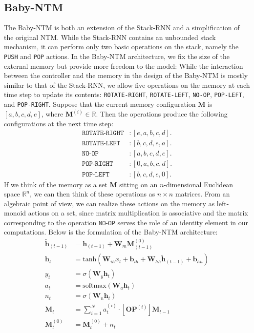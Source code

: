 \documentclass[11pt,a4paper]{article}
\theoremstyle{plain}
\newcommand{\weight}[1] {\mathbf{W}_{#1}}
\newcommand{\bias}[1] {\mathbf{b}_{#1}}
\newcommand{\hidden}[1] {\mathbf{h}_{#1}}
\newcommand{\hiddenp}[1] {\mathbf{\tilde{h}}_{#1}}
\begin{document}
\subsection{Baby-NTM}
The Baby-NTM is both an extension of the Stack-RNN and a simplification of the original NTM. While the Stack-RNN contains an unbounded stack mechanism, it can perform only two basic operations on the stack, namely the \texttt{PUSH} and \texttt{POP} actions. In the Baby-NTM architecture, we fix the size of the external memory but provide more freedom to the model: While the interaction between the controller and the memory in the design of the Baby-NTM is mostly similar to that of the Stack-RNN, we allow five operations on the memory at each time step to update its contents: \texttt{ROTATE-RIGHT}, \texttt{ROTATE-LEFT}, \texttt{NO-OP}, \texttt{POP-LEFT}, and \texttt{POP-RIGHT}. Suppose that the current memory configuration $\mathbf{M}$ is $[a, b, c, d, e]$, where $\mathbf{M}^{(i)} \in \mathbb{R}$. Then the operations produce the following configurations at the next time step: 
\begin{align*}
\texttt{ROTATE-RIGHT}&: [e, a, b, c, d]. \\
\texttt{ROTATE-LEFT}& : [b, c, d, e, a]. \\
\texttt{NO-OP} &: [a, b, c, d, e]. \\
\texttt{POP-RIGHT} &: [0, a, b, c, d]. \\
\texttt{POP-LEFT} &: [b, c, d, e, 0]. 
\end{align*}
If we think of the memory as a set $\mathbf{M}$ sitting on an $n$-dimensional Euclidean space $\mathbb{R}^n$, we can then think of these operations as $n \times n$ matrices.
From an algebraic point of view, we can realize these actions on the memory as left-monoid actions on a set, since matrix multiplication is associative and the matrix corresponding to the operation $\texttt{NO-OP}$ serves the role of an identity element in our computations. Below is the formulation of the Baby-NTM architecture:
\begin{align*}
\hiddenp{(t-1)} &= \hidden{(t-1)} + \weight{m} \mathbf{M}_{(t-1)}^{(0)} \\
\hidden{t} &= \text{tanh}(\weight{ih} x_t + \bias{ih} + \weight{hh} \hiddenp{(t-1)} + \bias{hh})\\
y_t &= \sigma (\weight{y} \hidden{t})\\
a_t &= \text{softmax} (\weight{a} \hidden{t}) \\
n_t &= \sigma (\weight{n} \hidden{t}) \\
\mathbf{M}_{t} &= \sum_{i=1}^{N} a_t ^{(i)} \cdot \left[\mathbf{OP}^{(i)}\right] \mathbf{M}_{t-1}\\
\mathbf{M}_{t}^{(0)} &= \mathbf{M}_{t}^{(0)} + n_t
\end{align*} 
\end{document}
